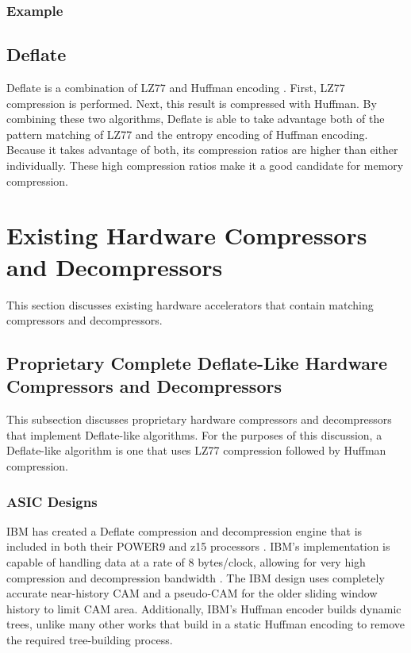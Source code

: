 \documentclass[doublespace,nopageskip]{VTthesis}
\begin{document}
\subsubsection{Example}\label{sss:lz78_example}

\subsection{Deflate}\label{ss:deflate}
Deflate is a combination of LZ77 and Huffman encoding \cite{deflate}. First, LZ77 compression is performed. Next, this result is compressed with Huffman. By combining these two algorithms, Deflate is able to take advantage both of the pattern matching of LZ77 and the entropy encoding of Huffman encoding. Because it takes advantage of both, its compression ratios are higher than either individually. These high compression ratios make it a good candidate for memory compression.

\section{Existing Hardware Compressors and Decompressors}\label{se:existing_hardware_compressors_and_decompressors}
This section discusses existing hardware accelerators that contain matching compressors and decompressors.

\subsection{Proprietary Complete Deflate-Like Hardware Compressors and Decompressors}\label{ss:complete_deflate-like_hardware_compressors_and_decompressors}
This subsection discusses proprietary hardware compressors and decompressors that implement Deflate-like algorithms. For the purposes of this discussion, a Deflate-like algorithm is one that uses LZ77 compression followed by Huffman compression.

\subsubsection{ASIC Designs}\label{sss:asic_designs}
IBM has created a Deflate compression and decompression engine that is included in both their POWER9 and z15 processors \cite{ibm}. IBM's implementation is capable of handling data at a rate of 8 bytes/clock, allowing for very high compression and decompression bandwidth \cite{ibm}. The IBM design uses completely accurate near-history CAM and a pseudo-CAM for the older sliding window history to limit CAM area. Additionally, IBM's Huffman encoder builds dynamic trees, unlike many other works that build in a static Huffman encoding to remove the required tree-building process.
\end{document}
